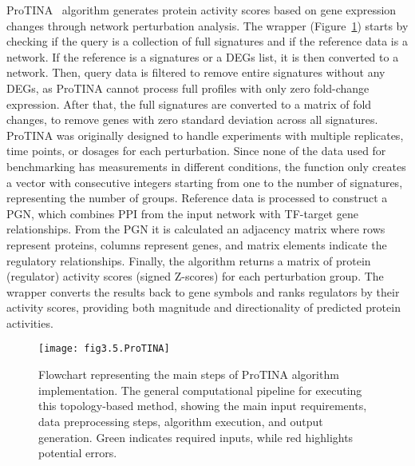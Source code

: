 \gls{ProTINA}~\cite{RN80} algorithm generates protein activity scores based on gene expression changes through network perturbation analysis.
The wrapper (Figure~\ref{fig:fig3.5.ProTINA}) starts by checking if the query is a collection of full signatures and if the reference data is a network.
If the reference is a signatures or a \gls{DEGs} list, it is then converted to a network.
Then, query data is filtered to remove entire signatures without any \gls{DEGs}, as \gls{ProTINA} cannot process full profiles with only zero fold-change expression.
After that, the full signatures are converted to a matrix of fold changes, to remove genes with zero standard deviation across all signatures. \gls{ProTINA} was originally designed to handle experiments with multiple replicates, time points, or dosages for each perturbation.
Since none of the data used for benchmarking has measurements in different conditions, the function only creates a vector with consecutive integers starting from one to the number of signatures, representing the number of groups.
Reference data is processed to construct a \gls{PGN}, which combines \gls{PPI} from the input network with \gls{TF}-target gene relationships.
From the \gls{PGN} it is calculated an adjacency matrix where rows represent proteins, columns represent genes, and matrix elements indicate the regulatory relationships.
Finally, the algorithm returns a matrix of protein (regulator) activity scores (signed Z-scores) for each perturbation group.
The wrapper converts the results back to gene symbols and ranks regulators by their activity scores, providing both magnitude and directionality of predicted protein activities.

\begin{figure}[htbp]
    \centering
    \texttt{[image: fig3.5.ProTINA]}
    \caption[Flowchart representing the main steps of ProTINA algorithm implementation.]{Flowchart representing the main steps of \gls{ProTINA} algorithm implementation. The general computational pipeline for executing this topology-based method, showing the main input requirements, data preprocessing steps, algorithm execution, and output generation. Green indicates required inputs, while red highlights potential errors.}
    \label{fig:fig3.5.ProTINA}
\end{figure}


